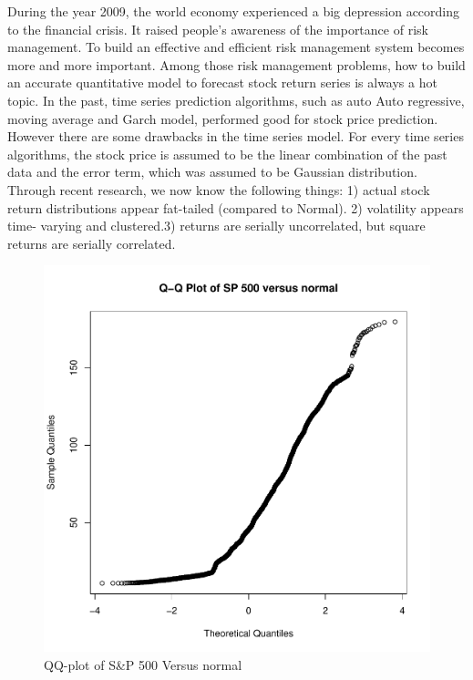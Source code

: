 \documentclass[12pt]{article}
\theoremstyle{plain}
\begin{document}
During the year 2009, the world economy experienced a big depression according to the financial crisis. It raised people's awareness of the importance of risk management. To build an effective and efficient risk management system becomes more and more important. Among those risk management problems, how to build an accurate quantitative model to forecast stock return series is always a hot topic. In the past, time series prediction algorithms, such as auto Auto regressive, moving average and Garch model, performed good for stock price prediction. However there are some drawbacks in the time series model. For every time series algorithms, the stock price is assumed to be the linear combination of the past data and the error term, which was assumed to be Gaussian distribution. Through recent research, we now know the following things: 1) actual stock return distributions appear fat-tailed (compared to Normal). 2) volatility appears time- varying and clustered.3) returns are serially uncorrelated, but square returns are serially correlated.
\begin{figure}[!htb]
\centering
\includegraphics[scale=0.50]{sp.pdf}
\caption{\label{graph:pdf1} QQ-plot of S\&P 500 Versus normal}
\end{figure}
\end{document}
